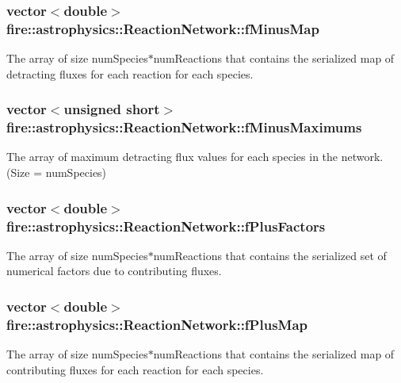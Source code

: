 \subsubsection[{f\+Minus\+Map}]{\setlength{\rightskip}{0pt plus 5cm}vector$<$double$>$ fire\+::astrophysics\+::\+Reaction\+Network\+::f\+Minus\+Map}\label{a00034_a9065be108e95b1604b0d53e2080f0b57}
The array of size num\+Species$\ast$num\+Reactions that contains the serialized map of detracting fluxes for each reaction for each species. \hypertarget{a00034_a4ea51dc9d41bf555592f93bb237e0440}{}
\subsubsection[{f\+Minus\+Maximums}]{\setlength{\rightskip}{0pt plus 5cm}vector$<$unsigned short$>$ fire\+::astrophysics\+::\+Reaction\+Network\+::f\+Minus\+Maximums}\label{a00034_a4ea51dc9d41bf555592f93bb237e0440}
The array of maximum detracting flux values for each species in the network. (Size = num\+Species) \hypertarget{a00034_aca9928041359ecf555a63e4f58e80164}{}
\subsubsection[{f\+Plus\+Factors}]{\setlength{\rightskip}{0pt plus 5cm}vector$<$double$>$ fire\+::astrophysics\+::\+Reaction\+Network\+::f\+Plus\+Factors}\label{a00034_aca9928041359ecf555a63e4f58e80164}
The array of size num\+Species$\ast$num\+Reactions that contains the serialized set of numerical factors due to contributing fluxes. \hypertarget{a00034_af3aa4184f759b2a8babf765667aa6604}{}
\subsubsection[{f\+Plus\+Map}]{\setlength{\rightskip}{0pt plus 5cm}vector$<$double$>$ fire\+::astrophysics\+::\+Reaction\+Network\+::f\+Plus\+Map}\label{a00034_af3aa4184f759b2a8babf765667aa6604}
The array of size num\+Species$\ast$num\+Reactions that contains the serialized map of contributing fluxes for each reaction for each species. \hypertarget{a00034_a6682680b1f2975fa8dc1288d3c463693}{}
